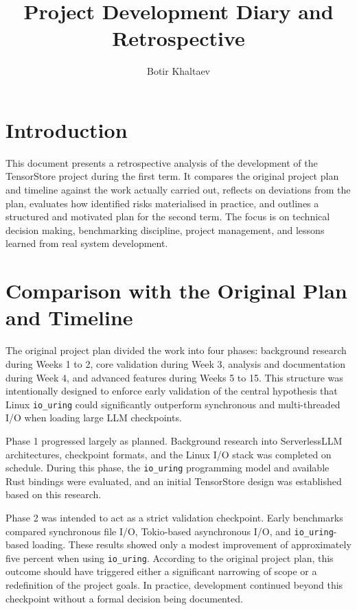 \documentclass{article}
\title{Project Development Diary and Retrospective}
\author{Botir Khaltaev}
\date{}
\begin{document}
\maketitle

\section{Introduction}

This document presents a retrospective analysis of the development of the TensorStore project during the first term. It compares the original project plan and timeline against the work actually carried out, reflects on deviations from the plan, evaluates how identified risks materialised in practice, and outlines a structured and motivated plan for the second term. The focus is on technical decision making, benchmarking discipline, project management, and lessons learned from real system development.

\section{Comparison with the Original Plan and Timeline}

The original project plan divided the work into four phases: background research during Weeks 1 to 2, core validation during Week 3, analysis and documentation during Week 4, and advanced features during Weeks 5 to 15. This structure was intentionally designed to enforce early validation of the central hypothesis that Linux \texttt{io\_uring} could significantly outperform synchronous and multi-threaded I/O when loading large LLM checkpoints.

Phase 1 progressed largely as planned. Background research into ServerlessLLM architectures, checkpoint formats, and the Linux I/O stack was completed on schedule. During this phase, the \texttt{io\_uring} programming model and available Rust bindings were evaluated, and an initial TensorStore design was established based on this research.

Phase 2 was intended to act as a strict validation checkpoint. Early benchmarks compared synchronous file I/O, Tokio-based asynchronous I/O, and \texttt{io\_uring}-based loading. These results showed only a modest improvement of approximately five percent when using \texttt{io\_uring}. According to the original project plan, this outcome should have triggered either a significant narrowing of scope or a redefinition of the project goals. In practice, development continued beyond this checkpoint without a formal decision being documented.
\end{document}
